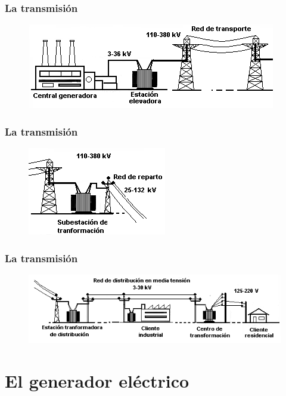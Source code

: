 \documentclass[14pt]{beamer}
\begin{document}
\begin{frame}
\frametitle{La transmisión}
\vspace*{-1cm}
\begin{figure}
\centering
\includegraphics[scale=0.8]{Imagenes/Transmision_01.png}
\end{figure}
\end{frame}
\begin{frame}
\frametitle{La transmisión}
\vspace*{-1cm}
\begin{figure}
\centering
\includegraphics[scale=0.8]{Imagenes/Transmision_02.png}
\end{figure}
\end{frame}
\begin{frame}
\frametitle{La transmisión}
\vspace*{-1cm}
\begin{figure}
\centering
\includegraphics[scale=0.6]{Imagenes/Transmision_03.png}
\end{figure}
\end{frame}

\section{El generador eléctrico}
\end{document}
